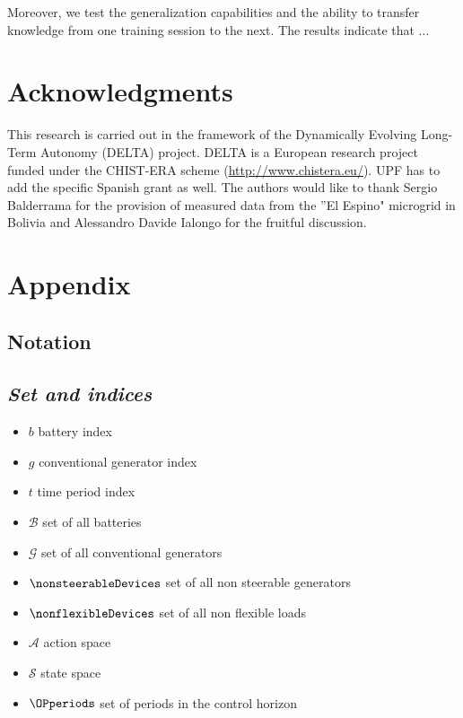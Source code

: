\documentclass{article}
\begin{document}
    Moreover, we test the generalization capabilities and the ability to transfer knowledge from one training session to the next. The results indicate that ...
    

\section{Acknowledgments}
This research is carried out in the framework of the Dynamically Evolving Long-Term Autonomy (DELTA) project.
DELTA is a European research project funded under the CHIST-ERA scheme (\url{http://www.chistera.eu/}). {\color{red} UPF has to add the specific Spanish grant as well.} The authors would like to thank Sergio Balderrama for the provision of measured data from the ''El Espino" microgrid in Bolivia and Alessandro Davide Ialongo for the fruitful discussion.






\section*{Appendix}

\subsection*{Notation}
\subsection*{\textit{\textbf{Set and indices}}}

\begin{itemize}
	\item $b$ battery index
	\item $g$ conventional generator index
	\item $t$ time period index
	\item $\mathcal{B}$ set of all batteries
	\item $\mathcal{G}$ set of all conventional generators
	\item $\nonsteerableDevices$ set of all non steerable generators
	\item $\nonflexibleDevices$ set of all non flexible loads
	\item $\mathcal{A}$ action space
	\item $\mathcal{S}$ state space
	\item $\OPperiods$ set of periods in the control horizon
\end{itemize}  
\end{document}
